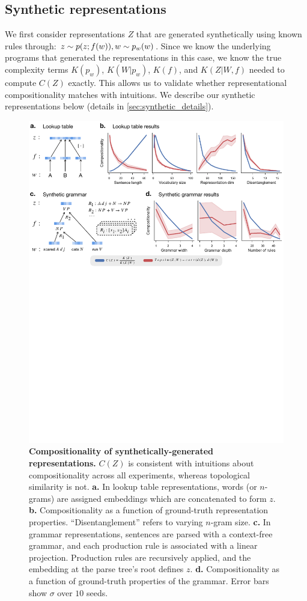 \documentclass{article} %
\newcommand{\comp}{representational compositionality}
\begin{document}
\subsection{Synthetic representations}
\label{sec:synthetic}

We first consider representations $Z$ that are generated synthetically using known rules through: $z \sim p(z ; f(w)),\space w \sim p_w(w)$. Since we know the underlying programs that generated the representations in this case, we know the true complexity terms $K(p_w)$, $K(W | p_w)$, $K(f)$, and $K(Z | W, f)$ needed to compute $C(Z)$ exactly. This allows us to validate whether \comp{} matches with intuitions. We describe our synthetic representations below (details in \cref{sec:synthetic_details}).

\begin{figure}[ht]
    \centering
    \includegraphics[width=\linewidth]{figures/synthetic.pdf}
    \caption{\textbf{Compositionality of synthetically-generated representations.} $C(Z)$ is consistent with intuitions about compositionality across all experiments, whereas topological similarity is not. \textbf{a.} In lookup table representations, words (or $n$-grams) are assigned embeddings which are concatenated to form $z$. \textbf{b.} Compositionality as a function of ground-truth representation properties. ``Disentanglement'' refers to varying $n$-gram size. \textbf{c.} In grammar representations, sentences are parsed with a context-free grammar, and each production rule is associated with a linear projection. Production rules are recursively applied, and the embedding at the parse tree's root defines $z$. \textbf{d.} Compositionality as a function of ground-truth properties of the grammar. Error bars show $\sigma$ over $10$ seeds.}

\end{figure}
\end{document}
